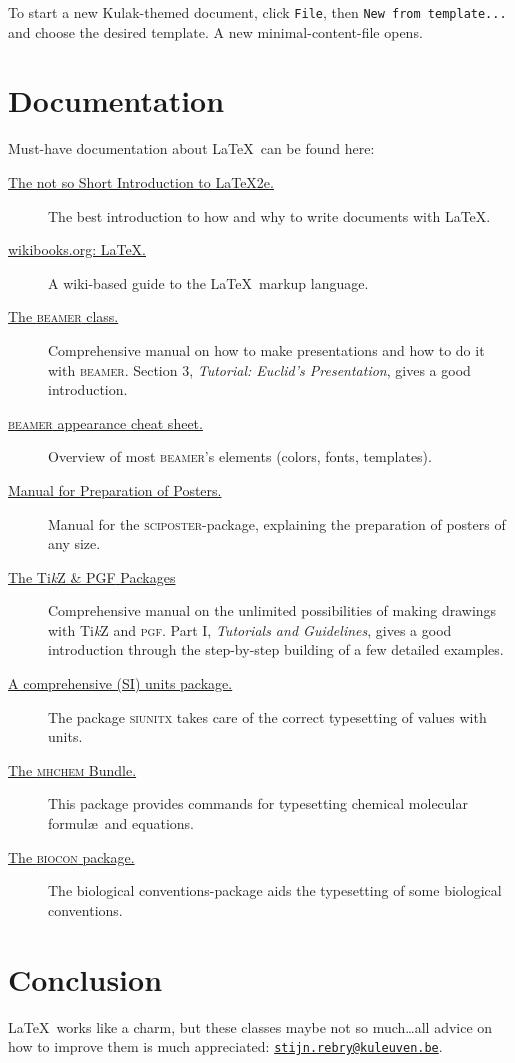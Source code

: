 \documentclass[kulak]{kulakarticle} %
\begin{document}
To start a new Kulak-themed document, click \texttt{File}, then \texttt{New from template...} and choose the desired template. A new minimal-content-file opens.

\section{Documentation}
Must-have documentation about \LaTeX\ can be found here:
\begin{description}
\item[\href{http://mirrors.ctan.org/info/lshort/english/lshort.pdf}{The not so Short Introduction to \LaTeX2e.}]
  The best introduction to how and why to write documents with \LaTeX.
\item[\href{http://en.wikibooks.org/wiki/LaTeX}{wikibooks.org: \LaTeX.}]
  A wiki-based guide to the \LaTeX\ markup language.
\item[\href{http://mirrors.ctan.org/macros/latex/contrib/beamer/doc/beameruserguide.pdf}{The \textsc{beamer} class.}]
  Comprehensive manual on how to make presentations and how to do it with \textsc{beamer}. Section 3, \emph{Tutorial: Euclid’s Presentation}, gives a good introduction.
\item[\href{https://www.cpt.univ-mrs.fr/~masson/latex/Beamer-appearance-cheat-sheet.pdf}{\textsc{beamer} appearance cheat sheet.}]
  Overview of most \textsc{beamer}’s elements (colors, fonts, templates).
\item[\href{http://mirrors.ctan.org/macros/latex/contrib/sciposter/scipostermanual.pdf}{Manual for Preparation of Posters.}]
  Manual for the \textsc{sciposter}-package, explaining the preparation of posters of any size.
\item[\href{https://mirror.lyrahosting.com/CTAN/graphics/pgf/base/doc/pgfmanual.pdf}{The Ti\emph{k}Z \& \textsc{PGF} Packages}] Comprehensive manual on the unlimited possibilities of making drawings with Ti\emph{k}Z and \textsc{pgf}. Part I, \emph{Tutorials and Guidelines}, gives a good introduction through the step-by-step building of a few detailed examples.
\item[\href{http://mirrors.ctan.org/macros/latex/contrib/siunitx/siunitx.pdf}{A comprehensive (SI) units package.}]
The package \textsc{siunitx} takes care of the correct typesetting of values with units.
\item[\href{http://mirrors.ctan.org/macros/latex/contrib/mhchem/mhchem.pdf}{The \textsc{mhchem} Bundle.}] This package provides commands for typesetting chemical molecular formul\ae\ and equations.
\item[\href{http://mirrors.ctan.org/macros/latex/contrib/biocon/manual.pdf}{The \textsc{biocon} package.}] The biological conventions-package aids the typesetting of some biological conventions.
\end{description}

\section*{Conclusion}

\LaTeX\ works like a charm, but these classes maybe not so much\ldots all advice on how to improve them is much appreciated: \href{mailto:stijn.rebry@kuleuven.be}{\texttt{stijn.rebry@kuleuven.be}}.
\end{document}
